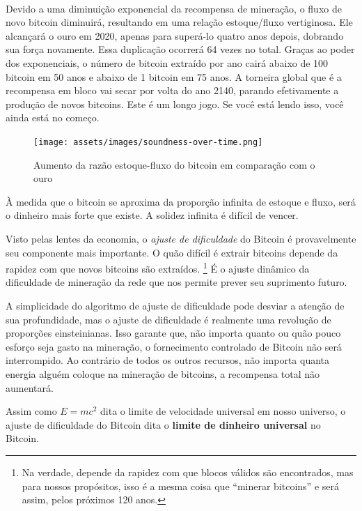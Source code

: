 \paragraph{}
Devido a uma diminuição exponencial da recompensa de mineração, o fluxo de novo bitcoin diminuirá, resultando em uma relação estoque/fluxo vertiginosa. Ele alcançará o ouro em 2020, apenas para superá-lo quatro anos depois, dobrando sua força novamente. Essa duplicação ocorrerá 64 vezes no total. Graças ao poder dos exponenciais, o número de bitcoin extraído por ano cairá abaixo de 100 bitcoin em 50 anos e abaixo de 1 bitcoin em 75 anos. A torneira global que é a recompensa em bloco vai secar por volta do ano 2140, parando efetivamente a produção de novos bitcoins. Este é um longo jogo. Se você está lendo isso, você ainda está no começo.

\begin{figure}
  \texttt{[image: assets/images/soundness-over-time.png]}
  \caption{Aumento da razão estoque-fluxo do bitcoin em comparação com o ouro}
  \label{fig:soundness-over-time}
\end{figure}

À medida que o bitcoin se aproxima da proporção infinita de estoque e fluxo, será o dinheiro mais forte que existe. A solidez infinita é difícil de vencer.

Visto pelas lentes da economia, o \textit{ajuste de dificuldade} do Bitcoin é provavelmente seu componente mais importante. O quão difícil é extrair bitcoins depende da rapidez com que novos bitcoins são extraídos. \footnote{Na verdade, depende da rapidez com que blocos válidos são encontrados, mas para nossos propósitos, isso é a mesma coisa que \enquote{minerar bitcoins} e será assim, pelos próximos 120 anos.} É o ajuste dinâmico da dificuldade de mineração da rede que nos permite prever seu suprimento futuro.

A simplicidade do algoritmo de ajuste de dificuldade pode desviar a atenção de sua profundidade, mas o ajuste de dificuldade é realmente uma revolução de proporções einsteinianas. Isso garante que, não importa quanto ou quão pouco esforço seja gasto na mineração, o fornecimento controlado de Bitcoin não será interrompido. Ao contrário de todos os outros recursos, não importa quanta energia alguém coloque na mineração de bitcoins, a recompensa total não aumentará.

Assim como $E=mc^2$ dita o limite de velocidade universal em nosso universo, o ajuste de dificuldade do Bitcoin dita o \textbf{limite de dinheiro universal} no Bitcoin.

